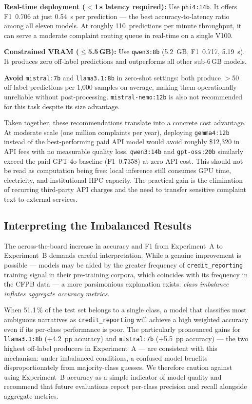 \documentclass[journal]{IEEEtran}
\begin{document}
\textbf{Real-time deployment ($<$1\,s latency required):}
Use \texttt{phi4:14b}. It offers F1~0.706 at just 0.54~s per
prediction — the best accuracy-to-latency ratio among all eleven models.
At roughly 110~predictions per minute throughput, it can serve a
moderate complaint routing queue in real-time on a single V100.

\textbf{Constrained VRAM ($\leq$5.5\,GB):}
Use \texttt{qwen3:8b} (5.2~GB, F1~0.717, 5.19~s). It produces zero
off-label predictions and outperforms all other sub-6\,GB models.

\textbf{Avoid} \texttt{mistral:7b} and \texttt{llama3.1:8b} in
zero-shot settings: both produce $>$50 off-label predictions per
1,000 samples on average, making them operationally unreliable
without post-processing.
\texttt{mistral-nemo:12b} is also not recommended for this task
despite its size advantage.

Taken together, these recommendations translate into a concrete cost
advantage. At moderate scale (one million complaints per year),
deploying \texttt{gemma4:12b} instead of the best-performing paid API
model would avoid roughly \$12,320 in API fees with no measurable
quality loss. \texttt{qwen3:14b} and \texttt{gpt-oss:20b} similarly
exceed the paid GPT-4o baseline (F1~0.7358) at zero API cost. This
should not be read as computation being free: local inference still
consumes GPU time, electricity, and institutional HPC capacity. The
practical gain is the elimination of recurring third-party API charges
and the need to transfer sensitive complaint text to external services.

\subsection{Interpreting the Imbalanced Results}

The across-the-board increase in accuracy and F1 from Experiment~A
to Experiment~B demands careful interpretation. While a genuine
improvement is possible — models may be aided by the greater
frequency of \texttt{credit\_reporting} training signal in
their pre-training corpora, which coincides with its frequency in
the CFPB data — a more parsimonious explanation exists:
\emph{class imbalance inflates aggregate accuracy metrics}.

When 51.1\,\% of the test set belongs to a single class, a model
that classifies most ambiguous narratives as \texttt{credit\_reporting}
will achieve a high weighted accuracy even if its per-class performance
is poor. The particularly pronounced gains for \texttt{llama3.1:8b}
(+4.2~pp accuracy) and \texttt{mistral:7b} (+5.5~pp accuracy) — the
two highest off-label producers in Experiment~A — are consistent
with this mechanism: under imbalanced conditions, a confused model
benefits disproportionately from majority-class guesses. We therefore
caution against using Experiment~B accuracy as a simple indicator of
model quality and recommend that future evaluations report per-class
precision and recall alongside aggregate metrics.
\end{document}
